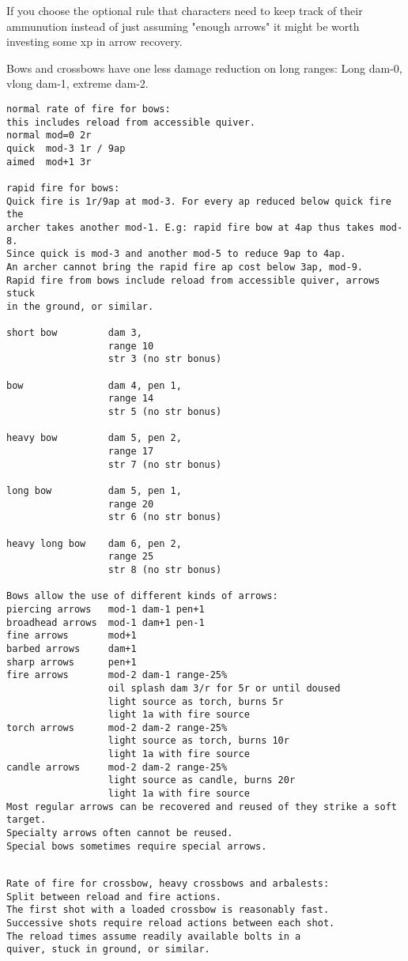 If you choose the optional rule that characters need to keep track of their ammunution instead of just assuming "enough arrows" it might be worth investing some xp in arrow recovery.

Bows and crossbows have one less damage reduction on long ranges: Long dam-0, vlong dam-1, extreme dam-2.

\small \begin{verbatim}
normal rate of fire for bows:
this includes reload from accessible quiver.
normal mod=0 2r
quick  mod-3 1r / 9ap
aimed  mod+1 3r

rapid fire for bows:
Quick fire is 1r/9ap at mod-3. For every ap reduced below quick fire the
archer takes another mod-1. E.g: rapid fire bow at 4ap thus takes mod-8. 
Since quick is mod-3 and another mod-5 to reduce 9ap to 4ap.
An archer cannot bring the rapid fire ap cost below 3ap, mod-9.
Rapid fire from bows include reload from accessible quiver, arrows stuck 
in the ground, or similar.

short bow         dam 3,
                  range 10
                  str 3 (no str bonus)

bow               dam 4, pen 1,
                  range 14
                  str 5 (no str bonus)

heavy bow         dam 5, pen 2,
                  range 17
                  str 7 (no str bonus)

long bow          dam 5, pen 1,
                  range 20
                  str 6 (no str bonus)

heavy long bow    dam 6, pen 2,
                  range 25
                  str 8 (no str bonus)

Bows allow the use of different kinds of arrows:
piercing arrows   mod-1 dam-1 pen+1
broadhead arrows  mod-1 dam+1 pen-1
fine arrows       mod+1
barbed arrows     dam+1
sharp arrows      pen+1
fire arrows       mod-2 dam-1 range-25%
                  oil splash dam 3/r for 5r or until doused
                  light source as torch, burns 5r
                  light 1a with fire source
torch arrows      mod-2 dam-2 range-25%
                  light source as torch, burns 10r
                  light 1a with fire source
candle arrows     mod-2 dam-2 range-25%
                  light source as candle, burns 20r
                  light 1a with fire source
Most regular arrows can be recovered and reused of they strike a soft target.
Specialty arrows often cannot be reused.
Special bows sometimes require special arrows.


\end{verbatim} \pagebreak[1] \begin{verbatim}
Rate of fire for crossbow, heavy crossbows and arbalests:
Split between reload and fire actions.
The first shot with a loaded crossbow is reasonably fast.
Successive shots require reload actions between each shot.
The reload times assume readily available bolts in a 
quiver, stuck in ground, or similar.


\end{verbatim}
